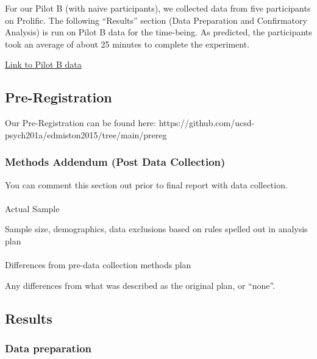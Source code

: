 \documentclass[
  letterpaper,
  DIV=11,
  numbers=noendperiod]{scrartcl}
\makeatletter
\let\oldparagraph\paragraph
\renewcommand{\paragraph}{
    \@ifstar
      \xxxParagraphStar
      \xxxParagraphNoStar
  }
\newcommand{\xxxParagraphStar}[1]{\oldparagraph*{#1}\mbox{}}
\newcommand{\xxxParagraphNoStar}[1]{\oldparagraph{#1}\mbox{}}
\makeatother
\begin{document}
For our Pilot B (with naive participants), we collected data from five
participants on Prolific. The following ``Results'' section (Data
Preparation and Confirmatory Analysis) is run on Pilot B data for the
time-being. As predicted, the participants took an average of about 25
minutes to complete the experiment.

\href{https://github.com/ucsd-psych201a/edmiston2015/tree/main/data/pilot_b}{Link
to Pilot B data}

\subsection{Pre-Registration}\label{pre-registration}

Our Pre-Registration can be found here:
https://github.com/ucsd-psych201a/edmiston2015/tree/main/prereg

\subsubsection{Methods Addendum (Post Data
Collection)}\label{methods-addendum-post-data-collection}

You can comment this section out prior to final report with data
collection.

\paragraph{Actual Sample}\label{actual-sample}

Sample size, demographics, data exclusions based on rules spelled out in
analysis plan

\paragraph{Differences from pre-data collection methods
plan}\label{differences-from-pre-data-collection-methods-plan}

Any differences from what was described as the original plan, or
``none''.

\subsection{Results}\label{results}

\subsubsection{Data preparation}\label{data-preparation}
\end{document}
